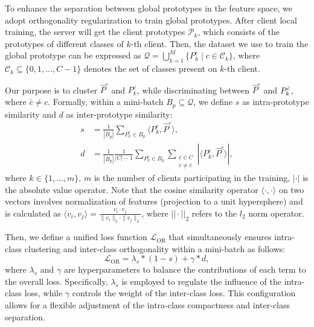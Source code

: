 To enhance the separation between global prototypes in the feature space, we adopt orthogonality regularization to train global prototypes. After client local training, the server will get the client prototypes $\mathcal{P}_k$, which consists of the prototypes of different classes of $k$-th client. Then, the dataset we use to train the global prototype can be expressed as $\mathcal{Q} = \bigcup_{k=1}^{M} \{ P^c_k \mid c \in \mathcal{C}_k \}$, where $\mathcal{C}_k \subseteq \{0, 1, ..., C - 1\}$ denotes the set of classes present on $k$-th client.

Our purpose is to cluster $\hat{P}^c$ and $P_k^c$, while discriminating between $\hat{P}^c$ and $P_k^{\Bar{c}}$, where $\bar{c} \ne c$. Formally, within a mini-batch $B_p \subseteq \mathcal{Q}$, we define $s$ as intra-prototype similarity and $d$ as inter-prototype similarity:
\begin{align}
    s &= \frac{1}{|B_p|}\sum_{P_k^c \in B_p}\langle P_k^c, \hat{P}^c\rangle, 
    \label{eq:similarity eqution}\\[1ex]
    d &= \frac{1}{|B_p|}\frac{1}{|C| - 1}\sum_{P_k^c \in B_p}\sum_{\substack{\bar{c} \in C \\ c\ne\bar{c}}}\left|\langle P_k^c, \hat{P}^{\bar{c}}\rangle\right|,
    \label{eq:dissimilarity eqution}
\end{align}
where $k \in \{1, \ldots, m\}$, $m$ is the number of clients participating in the training, $\left|\cdot\right|$ is the absolute value operator. Note that the cosine similarity operator $\langle\cdot,\cdot\rangle $ on two vectors involves normalization of features (projection to a unit hypersphere) and is calculated as $\langle v_i, v_j \rangle=\frac{v_i\cdot v_j}{\|v_i\|_2\cdot\|v_j\|_2}$, where $||\cdot||_2$ refers to the $l_2$ norm operator.

Then, we define a unified loss function $\mathcal{L}_{\mathrm{OR}}$ that simultaneously ensures intra-class clustering and inter-class orthogonality within a mini-batch as follows:
\begin{equation}
    \mathcal{L}_{\mathrm{OR}}=\lambda_s*(1-s)+\gamma*d,
    \label{eq:OC Loss eqution}
\end{equation}
where $\lambda_s$ and $\gamma$ are hyperparameters to balance the contributions of each term to the overall loss. Specifically, $\lambda_s$ is employed to regulate the influence of the intra-class loss, while $\gamma$ controls the weight of the inter-class loss. This configuration allows for a flexible adjustment of the intra-class compactness and inter-class separation.

